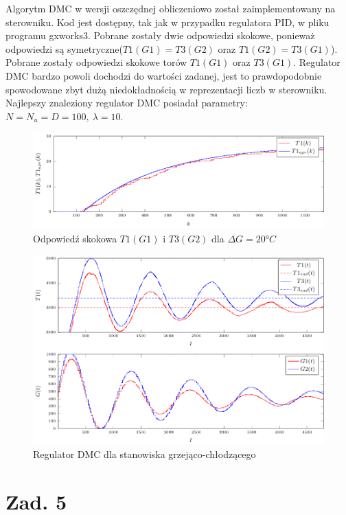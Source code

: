 \documentclass[a4paper,titlepage,11pt,twosides,floatssmall]{mwrep}
\begin{document}
Algorytm DMC w wersji oszczędnej obliczeniowo został zaimplementowany na sterowniku. Kod jest dostępny, tak jak w przypadku regulatora PID, w pliku programu gxworks3. Pobrane zostały dwie odpowiedzi skokowe, ponieważ odpowiedzi są symetryczne($ T1(G1) = T3(G2) $ oraz $ T1(G2) = T3(G1) $). Pobrane zostały odpowiedzi skokowe torów $T1(G1)$ oraz $T3(G1)$.  Regulator DMC bardzo powoli dochodzi do wartości zadanej, jest to prawdopodobnie spowodowane zbyt dużą niedokładnością w reprezentacji liczb w sterowniku. Najlepszy znaleziony regulator DMC posiadał parametry: $N=N_{u}=D=100, \ \lambda = 10$.

\begin{figure}[]
	\centering
	\includegraphics[scale=1]{../wykresy/zad4_odp1.pdf}
	\caption{Odpowiedź skokowa $T1(G1)$ i $T3(G2)$ dla $\Delta G = 20°C$}
	\label{zad4_odp1}
\end{figure}


\begin{figure}[]
	\centering
	\includegraphics[scale=1]{../wykresy/zad4_dmc.pdf}
	\caption{Regulator DMC dla stanowiska grzejąco-chłodzącego}
	\label{zad4_pid}
\end{figure}


\chapter{Zad. 5}
\end{document}
